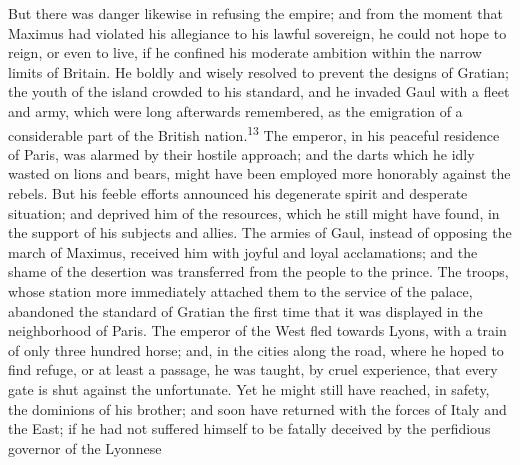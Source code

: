 

But there was danger likewise in refusing the empire; and from
the moment that Maximus had violated his allegiance to his lawful
sovereign, he could not hope to reign, or even to live, if he
confined his moderate ambition within the narrow limits of
Britain. He boldly and wisely resolved to prevent the designs of
Gratian; the youth of the island crowded to his standard, and he
invaded Gaul with a fleet and army, which were long afterwards
remembered, as the emigration of a considerable part of the
British nation.\textsuperscript{13} The emperor, in his peaceful residence of
Paris, was alarmed by their hostile approach; and the darts which
he idly wasted on lions and bears, might have been employed more
honorably against the rebels. But his feeble efforts announced
his degenerate spirit and desperate situation; and deprived him
of the resources, which he still might have found, in the support
of his subjects and allies. The armies of Gaul, instead of
opposing the march of Maximus, received him with joyful and loyal
acclamations; and the shame of the desertion was transferred from
the people to the prince. The troops, whose station more
immediately attached them to the service of the palace, abandoned
the standard of Gratian the first time that it was displayed in
the neighborhood of Paris. The emperor of the West fled towards
Lyons, with a train of only three hundred horse; and, in the
cities along the road, where he hoped to find refuge, or at least
a passage, he was taught, by cruel experience, that every gate is
shut against the unfortunate. Yet he might still have reached, in
safety, the dominions of his brother; and soon have returned with
the forces of Italy and the East; if he had not suffered himself
to be fatally deceived by the perfidious governor of the Lyonnese
